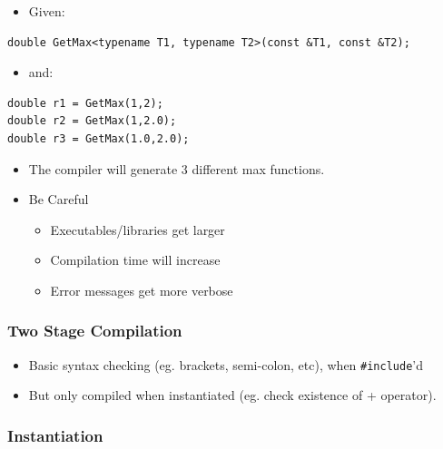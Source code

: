 \begin{itemize}
\itemsep1pt\parskip0pt
\item
  Given:
\end{itemize}

\begin{verbatim}
double GetMax<typename T1, typename T2>(const &T1, const &T2);
\end{verbatim}

\begin{itemize}
\itemsep1pt\parskip0pt
\item
  and:
\end{itemize}

\begin{verbatim}
double r1 = GetMax(1,2);
double r2 = GetMax(1,2.0);
double r3 = GetMax(1.0,2.0);
\end{verbatim}

\begin{itemize}
\itemsep1pt\parskip0pt
\item
  The compiler will generate 3 different max functions.
\item
  Be Careful

  \begin{itemize}
  \itemsep1pt\parskip0pt
  \item
    Executables/libraries get larger
  \item
    Compilation time will increase
  \item
    Error messages get more verbose
  \end{itemize}
\end{itemize}

\subsubsection{Two Stage Compilation}\label{two-stage-compilation}

\begin{itemize}
\itemsep1pt\parskip0pt
\item
  Basic syntax checking (eg. brackets, semi-colon, etc), when
  \texttt{\#include}'d
\item
  But only compiled when instantiated (eg. check existence of +
  operator).
\end{itemize}

\subsubsection{Instantiation}\label{instantiation}

